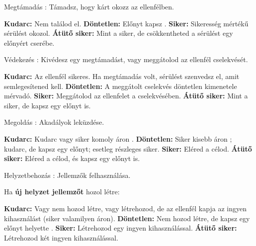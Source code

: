 \begin{multicols*}{2}


Megtámadás : Támadsz, hogy kárt okozz az ellenfélben.

\begin{itemize}
    \failureitem \textbf{Kudarc:} Nem találod el.
    \tieitem \textbf{Döntetlen:} Előnyt kapsz .
    \successitem \textbf{Siker:} Sikeresség mértékű sérülést okozol.
    \successwithstyleitem \textbf{Átütő siker:} Mint a siker, de csökkentheted a sérülést egy előnyért cserébe.
\end{itemize}

Védekezés : Kivédesz egy megtámadást, vagy meggátolod az ellenfél cselekvését.

\begin{itemize}
    \failureitem \textbf{Kudarc:} Az ellenfél sikeres. Ha megtámadás volt, sérülést szenvedsz el, amit semlegesítened kell.
    \tieitem \textbf{Döntetlen:} A meggátolt cselekvés döntetlen kimenetele mérvadó.
    \successitem \textbf{Siker:} Meggátolod az ellenfelet a cselekvésében.
    \successwithstyleitem \textbf{Átütő siker:} Mint a siker, de kapsz egy előnyt is.
\end{itemize}

Megoldás : Akadályok leküzdése.

\begin{itemize}
    \failureitem \textbf{Kudarc:} Kudarc vagy siker komoly áron .
    \tieitem \textbf{Döntetlen:} Siker kisebb áron ; kudarc, de kapsz egy előnyt; esetleg részleges siker.
    \successitem \textbf{Siker:} Eléred a célod.
    \successwithstyleitem \textbf{Átütő siker:} Eléred a célod, és kapsz egy előnyt is.
\end{itemize}

Helyzetbehozás : Jellemzők felhasználása.

Ha \textbf{új helyzet jellemzőt} hozol létre: 

\begin{itemize}
    \failureitem \textbf{Kudarc:} Vagy nem hozod létre, vagy létrehozod, de az ellenfél kapja az ingyen kihasználást (siker valamilyen áron).
    \tieitem \textbf{Döntetlen:} Nem hozod létre, de kapsz egy előnyt helyette .
    \successitem \textbf{Siker:} Létrehozod egy ingyen kihasználással.
    \successwithstyleitem \textbf{Átütő siker:} Létrehozod két ingyen kihasználással.
\end{itemize}


\end{multicols*}

